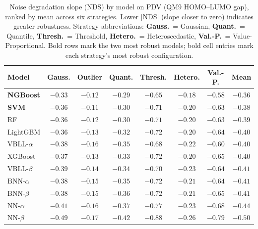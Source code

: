 \documentclass[pdflatex,sn-basic]{sn-jnl}%
\theoremstyle{thmstyleone}%
\theoremstyle{thmstyletwo}%
\theoremstyle{thmstylethree}%
\begin{document}
\begin{table}[htbp]
\centering
\caption{Noise degradation slope (NDS) by model on PDV (QM9 HOMO--LUMO gap), ranked by mean across six strategies. Lower $|$NDS$|$ (slope closer to zero) indicates greater robustness. Strategy abbreviations: \textbf{Gauss.}\ = Gaussian, \textbf{Quant.}\ = Quantile, \textbf{Thresh.}\ = Threshold, \textbf{Hetero.}\ = Heteroscedastic, \textbf{Val.-P.}\ = Value-Proportional. Bold rows mark the two most robust models; bold cell entries mark each strategy's most robust configuration.}
\label{tab:nds_ranking}
\small
\begin{tabular}{lccccccc}
\toprule
\textbf{Model} & \textbf{Gauss.} & \textbf{Outlier} & \textbf{Quant.} & \textbf{Thresh.} & \textbf{Hetero.} & \textbf{Val.-P.} & \textbf{Mean} \\
\midrule
\textbf{NGBoost}    & $\mathbf{-0.33}$ & $-0.12$ & $\mathbf{-0.29}$ & $\mathbf{-0.65}$ & $\mathbf{-0.18}$ & $\mathbf{-0.58}$ & $\mathbf{-0.36}$ \\
\textbf{SVM}        & $-0.36$ & $\mathbf{-0.11}$ & $-0.30$ & $-0.71$ & $-0.20$ & $-0.63$ & $-0.38$ \\
RF                  & $-0.36$ & $-0.12$ & $-0.30$ & $-0.71$ & $-0.20$ & $-0.63$ & $-0.39$ \\
LightGBM            & $-0.36$ & $-0.13$ & $-0.32$ & $-0.72$ & $-0.20$ & $-0.64$ & $-0.40$ \\
VBLL-$\alpha$       & $-0.38$ & $-0.16$ & $-0.35$ & $-0.68$ & $-0.22$ & $-0.60$ & $-0.40$ \\
XGBoost             & $-0.37$ & $-0.13$ & $-0.33$ & $-0.72$ & $-0.20$ & $-0.65$ & $-0.40$ \\
VBLL-$\beta$        & $-0.39$ & $-0.14$ & $-0.34$ & $-0.70$ & $-0.23$ & $-0.64$ & $-0.41$ \\
BNN-$\alpha$        & $-0.38$ & $-0.15$ & $-0.35$ & $-0.72$ & $-0.21$ & $-0.64$ & $-0.41$ \\
BNN-$\beta$         & $-0.38$ & $-0.15$ & $-0.36$ & $-0.72$ & $-0.21$ & $-0.65$ & $-0.41$ \\
NN-$\alpha$         & $-0.41$ & $-0.16$ & $-0.37$ & $-0.77$ & $-0.23$ & $-0.68$ & $-0.44$ \\
NN-$\beta$          & $-0.49$ & $-0.17$ & $-0.42$ & $-0.88$ & $-0.26$ & $-0.79$ & $-0.50$ \\
\bottomrule
\end{tabular}
\end{table}
\end{document}

